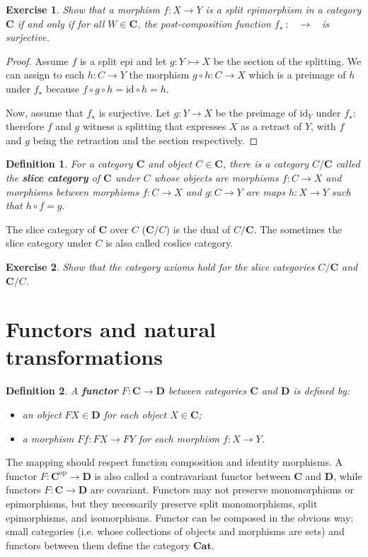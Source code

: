 \documentclass[a5paper,oneside,11pt]{article}
\newtheorem{ex}{Exercise}
\newtheorem{defn}{Definition}
\newcommand\id{\mathord{\mathrm{id}}}
\newcommand\1{\mathord{\mathrm{1}}}
\newcommand\cat[1]{\mathbf{#1}}
\newcommand\op{\mathrm{op}}
\newcommand\Hom[3]{\mathop{\mathsf{Hom}_{\cat{#1}}(#2, #3)}}
\begin{document}
\begin{ex}
    Show that a morphism $f : X \rightarrow Y$ is a split epimorphism in a category
    $\mathbf{C}$ if and only if for all $W \in \cat{C}$, the post-composition function
    $f_\star~:~\Hom{C}{W}{X} \rightarrow \Hom{C}{W}{Y}$ is surjective.
\end{ex}
\begin{proof}
    Assume $f$ is a split epi and let $g : Y \rightarrowtail X$
    be the section of the splitting.
    We can assign to each $h : C \rightarrow Y$ the morphism
    $g \circ h : C \rightarrow X$ which is a preimage of $h$ under $f_\star$ because
    $f \circ g \circ h = \id \circ h = h$.

    Now, assume that $f_\star$ is surjective.
    Let $g : Y \rightarrow X$ be the preimage of $\id_Y$ under $f_\star$:
    therefore $f$ and $g$ witness a splitting that expresses $X$ as a retract of $Y$,
    with $f$ and $g$ being the retraction and the section respectively.
\end{proof}

\begin{defn}
    \label{defn:slice}
    For a category $\cat{C}$ and object $C \in \cat{C}$, there is a category $C/\cat{C}$
    called the \textbf{slice category} of $\cat{C}$ under $C$ whose objects are
    morphisms $f : C \rightarrow X$ and morphisms between morphisms
    $f : C \rightarrow X$ and $g : C \rightarrow Y$ are maps $h : X \rightarrow Y$
    such that $h \circ f = g$.
\end{defn}
The slice category of $\cat{C}$ over $C$ ($\cat{C}/C$) is the dual of $C/\cat{C}$.
The sometimes the slice category under $C$ is also called coslice category.
\begin{ex}
    Show that the category axioms hold for the slice categories $C/\cat{C}$ and $\cat{C}/C$.
\end{ex}

\section{Functors and natural transformations}
\begin{defn}
\label{defn:functor}
A \textbf{functor} $F : \cat{C} \longrightarrow \cat{D}$ between categories $\cat{C}$
and $\cat{D}$ is defined by:
\begin{itemize}
    \item an object $F X \in \cat{D}$ for each object $X \in \cat{C}$;
    \item a morphism $F f : F X \rightarrow F Y$ for each morphism $f: X \rightarrow Y$.
\end{itemize}
\end{defn}
The mapping should respect function composition and identity morphisms.
A functor $F : \cat{C}^{\op} \longrightarrow \cat{D}$ is also called a contravariant functor
between $\cat{C}$ and $\cat{D}$, while functors $F : \cat{C} \longrightarrow \cat{D}$ are
covariant. Functors may not preserve monomorphisms or epimorphisms, but they
necessarily preserve split monomorphisms, split epimorphisms, and isomorphisms.
Functor can be composed in the obvious way:
small categories (i.e. whose collections of objects and morphisms are sets) and functors
between them define the category $\cat{Cat}$.
\end{document}
